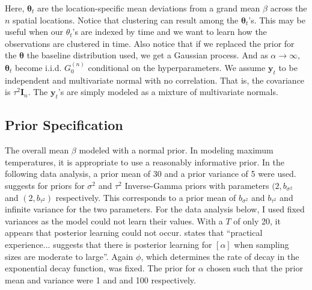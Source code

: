 \documentclass[11pt]{article}
\newcommand{\m}[1]{\mathbf{\bm{#1}}} %
\begin{document}
\noindent
Here, $\m\theta_t$ are the location-specific mean deviations from a grand mean
$\beta$ across the $n$ spatial locations. Notice that clustering can result
among the $\m\theta_t$'s. This may be useful when our $\theta_t$'s are indexed
by time and we want to learn how the observations are clustered in time.  Also
notice that if we replaced the prior for the $\m\theta$ the baseline
distribution used, we get a Gaussian process.  And as $\alpha \rightarrow
\infty$, $\m\theta_t$ become i.i.d. $G_0^{(n)}$ conditional on the
hyperparameters. We assume $\m y_t$ to be independent and multivariate
normal with no correlation. That is, the covariance is $\tau^2 \m I_n$.
The $\m y_t$'s are simply modeled as a mixture of multivariate normals.\\

\subsection{Prior Specification}
The overall mean $\beta$ modeled with a normal prior. In modeling maximum
temperatures, it is appropriate to use a reasonably informative prior. In the
following data analysis, a prior mean of 30 and a prior variance of 5 were
used.  \cite{sdp} suggests for priors for $\sigma^2$ and $\tau^2$ Inverse-Gamma
priors with parameters $(2,b_{\sigma^2}$ and $(2,b_{\tau^2})$ respectively.
This corresponds to a prior mean of $b_{\sigma^2}$ and $b_{\tau^2}$ and
infinite variance for the two parameters. For the data analysis below, 
I used fixed variances as the model could not learn their values.
With a $T$ of only 20, it appears that posterior learning could not occur.
\cite{sdp} states that ``practical experience... suggests that there is
posterior learning for $[\alpha]$ when sampling sizes are moderate to large''.
Again $\phi$, which determines the rate of decay in the exponential decay function,
was fixed. The prior for $\alpha$ chosen such that the prior mean and variance were 1 and 
and 100 respectively.\\
\end{document}
